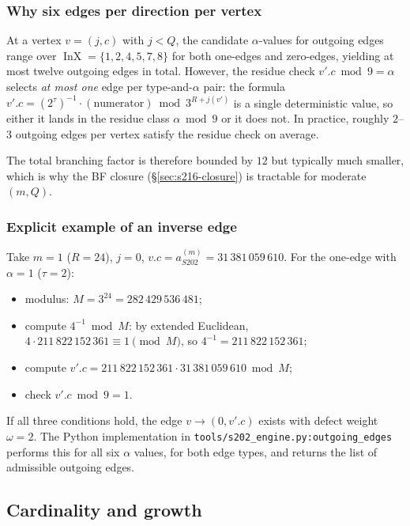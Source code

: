 \documentclass[11pt,a4paper]{article}
\theoremstyle{plain}
\theoremstyle{definition}
\newcommand{\aSat}{a_{S202}^{(m)}}
\DeclareMathOperator{\InX}{InX}
\begin{document}
\subsubsection*{Why six edges per direction per vertex}

At a vertex $v = (j, c)$ with $j < Q$, the candidate
$\alpha$-values for outgoing edges range over
$\InX = \{1, 2, 4, 5, 7, 8\}$ for both one-edges and zero-edges,
yielding at most twelve outgoing edges in total. However, the
residue check
$v'.c \bmod 9 = \alpha$
selects \emph{at most one} edge per type-and-$\alpha$ pair: the
formula $v'.c = (2^\tau)^{-1} \cdot (\text{numerator}) \bmod 3^{R+j(v')}$
is a single deterministic value, so either it lands in the residue
class $\alpha \bmod 9$ or it does not. In practice, roughly
$2$--$3$ outgoing edges per vertex satisfy the residue check on
average.

The total branching factor is therefore bounded by $12$ but
typically much smaller, which is why the BF closure
(\S\ref{sec:s216-closure}) is tractable for moderate $(m, Q)$.

\subsubsection*{Explicit example of an inverse edge}

Take $m = 1$ ($R = 24$), $j = 0$, $v.c = \aSat = 31\,381\,059\,610$.
For the one-edge with $\alpha = 1$ ($\tau = 2$):
\begin{itemize}
  \item modulus: $M = 3^{24} = 282\,429\,536\,481$;
  \item compute $4^{-1} \bmod M$: by extended Euclidean,
        $4 \cdot 211\,822\,152\,361 \equiv 1 \pmod{M}$, so
        $4^{-1} = 211\,822\,152\,361$;
  \item compute $v'.c = 211\,822\,152\,361 \cdot 31\,381\,059\,610 \bmod M$;
  \item check $v'.c \bmod 9 = 1$.
\end{itemize}
If all three conditions hold, the edge $v \to (0, v'.c)$ exists with
defect weight $\omega = 2$. The Python implementation in
\texttt{tools/s202\_engine.py:outgoing\_edges} performs this for all
six $\alpha$ values, for both edge types, and returns the list of
admissible outgoing edges.

\subsection{Cardinality and growth}
\end{document}
